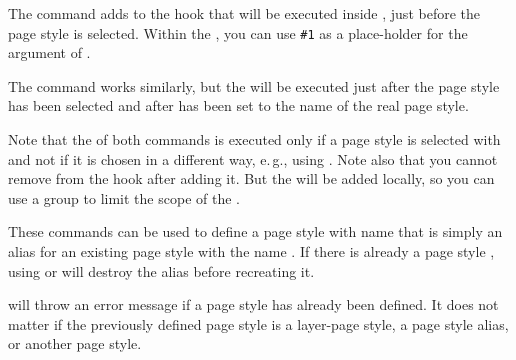 \begin{Declaration}
\end{Declaration}
The  command adds  to the hook%
 that will be executed inside ,
just before the page style is selected. Within the , you can use
\texttt{\#1} as a place-holder for the argument of
.

The  command works similarly, but the
 will be executed just after the page style has been selected and
after  has been set to the name of
the real page style.

Note that the  of both commands is executed
only if a page style is selected with  and not
if it is chosen in a different way, e.\,g., using
. Note also that you cannot remove
 from the hook after adding it. But the  will be added
locally, so you can use a group to limit the scope of the .%
\EndIndexGroup


\begin{Declaration}
\end{Declaration}
%
%
These commands can be used to define a page style with name  that is simply an alias for an existing page style with the
name . If there is already a page style
, using  or
 will destroy the alias before recreating it.

 will throw an error message if a page style
 has already been defined. It does not matter if
the previously defined page style is a layer-page style, a page style alias,
or another page style.

